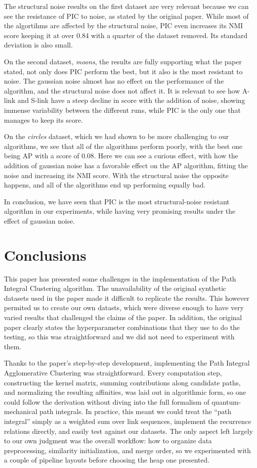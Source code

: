 \documentclass[
	10pt,
	parskip=half-,	
	paper=a4,
	english
	]{scrartcl}
\begin{document}
The structural noise results on the first dataset are very relevant because we can see the resistance of PIC to noise, as stated by the original paper. While most of the algortihms are affected by the structural noise, PIC even increases its NMI score keeping it at over 0.84 with a quarter of the dataset removed. Its standard deviation is also small.

On the second dataset, \textit{moons}, the results are fully supporting what the paper stated, not only does PIC perform the best, but it also is the most resistant to noise. The gaussian noise almost has no effect on the performance of the algorithm, and the structural noise does not affect it. It is relevant to see how A-link and S-link have a steep decline in score with the addition of noise, showing immense variability between the different runs, while PIC is the only one that manages to keep its score.

On the \textit{circles} dataset, which we had shown to be more challenging to our algorithms, we see that all of the algorithms perform poorly, with the best one being AP with a score of 0.08. Here we can see a curious effect, with how the addition of gaussian noise has a favorable effect on the AP algorithm, fitting the noise and increasing its NMI score. With the structural noise the opposite happens, and all of the algorithms end up performing equally bad.

In conclusion, we have seen that PIC is the most structural-noise resistant algorithm in our experiments, while having very promising results under the effect of gaussian noise.

\newpage
\section{Conclusions}

This paper has presented some challenges in the implementation of the Path Integral Clustering algorithm. The unavailability of the original synthetic datasets used in the paper made it difficult to replicate the results. This however permited us to create our own datasts, which were diverse enough to have very varied results that challenged the claims of the paper. In addition, the original paper clearly states the hyperparameter combinations that they use to do the testing, so this was straightforward and we did not need to experiment with them.

Thanks to the paper's step-by-step development, implementing the Path Integral Agglomerative Clustering was straightforward. Every computation step, constructing the kernel matrix, summing contributions along candidate paths, and normalizing the resulting affinities, was laid out in algorithmic form, so one could follow the derivation without diving into the full formalism of quantum-mechanical path integrals. In practice, this meant we could treat the “path integral” simply as a weighted sum over link sequences, implement the recurrence relations directly, and easily test against our datasets. The only aspect left largely to our own judgment was the overall workflow: how to organize data preprocessing, similarity initialization, and merge order, so we experimented with a couple of pipeline layouts before choosing the heap one presented.
\end{document}
